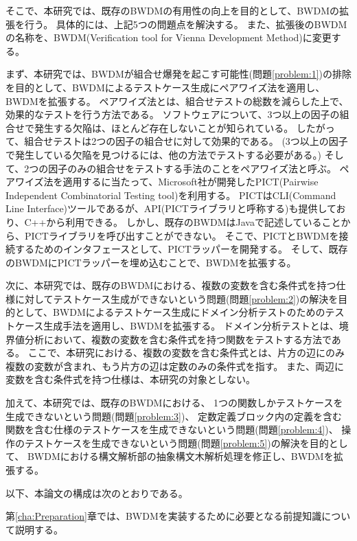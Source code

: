 \documentclass[uplatex, report, a4j, 10pt]{jsbook}
\newcommand{\tool}{BWDM}
\newcommand{\toolFullName}{Verification tool for Vienna Development Method}
\begin{document}
そこで、本研究では、既存のBWDMの有用性の向上を目的として、BWDMの拡張を行う\cite{hirakoba1, hirakoba2, hirakoba3, hirakoba4, hirakoba5}。
具体的には、上記5つの問題点を解決する。
また、拡張後のBWDMの名称を、\tool{}(\toolFullName{})に変更する。

まず、本研究では、BWDMが組合せ爆発を起こす可能性(問題\ref{problem:1})の排除を目的として、BWDMによるテストケース生成にペアワイズ法を適用し、BWDMを拡張する。
ペアワイズ法とは、組合せテストの総数を減らした上で、効果的なテストを行う方法である\cite{pairwise}。
ソフトウェアについて、3つ以上の因子の組合せで発生する欠陥は、ほとんど存在しないことが知られている\cite{over3fact}。
したがって、組合せテストは2つの因子の組合せに対して効果的である。
(3つ以上の因子で発生している欠陥を見つけるには、他の方法でテストする必要がある。)
そして、2つの因子のみの組合せをテストする手法のことをペアワイズ法と呼ぶ。
ペアワイズ法を適用するに当たって、Microsoft社が開発したPICT(Pairwise Independent Combinatorial Testing tool)\cite{pict}を利用する。
PICTはCLI(Command Line Interface)ツールであるが、API(PICTライブラリと呼称する)も提供しており、C++から利用できる。
しかし、既存のBWDMはJavaで記述していることから、PICTライブラリを呼び出すことができない。
そこで、PICTとBWDMを接続するためのインタフェースとして、PICTラッパーを開発する。
そして、既存のBWDMにPICTラッパーを埋め込むことで、BWDMを拡張する。

次に、本研究では、既存のBWDMにおける、複数の変数を含む条件式を持つ仕様に対してテストケース生成ができないという問題(問題\ref{problem:2})の解決を目的として、BWDMによるテストケース生成にドメイン分析テストのためのテストケース生成手法を適用し、BWDMを拡張する。
ドメイン分析テストとは、境界値分析において、複数の変数を含む条件式を持つ関数をテストする方法である\cite{izon}\cite{istqb}。
ここで、本研究における、複数の変数を含む条件式とは、片方の辺にのみ複数の変数が含まれ、もう片方の辺は定数のみの条件式を指す。
また、両辺に変数を含む条件式を持つ仕様は、本研究の対象としない。

加えて、本研究では、既存のBWDMにおける、
1つの関数しかテストケースを生成できないという問題(問題\ref{problem:3})、
定数定義ブロック内の定義を含む関数を含む仕様のテストケースを生成できないという問題(問題\ref{problem:4})、
操作のテストケースを生成できないという問題(問題\ref{problem:5})の解決を目的として、
BWDMにおける構文解析部の抽象構文木解析処理を修正し、BWDMを拡張する。

以下、本論文の構成は次のとおりである。

第\ref{cha:Preparation}章では、\tool{}を実装するために必要となる前提知識について説明する。
\end{document}
